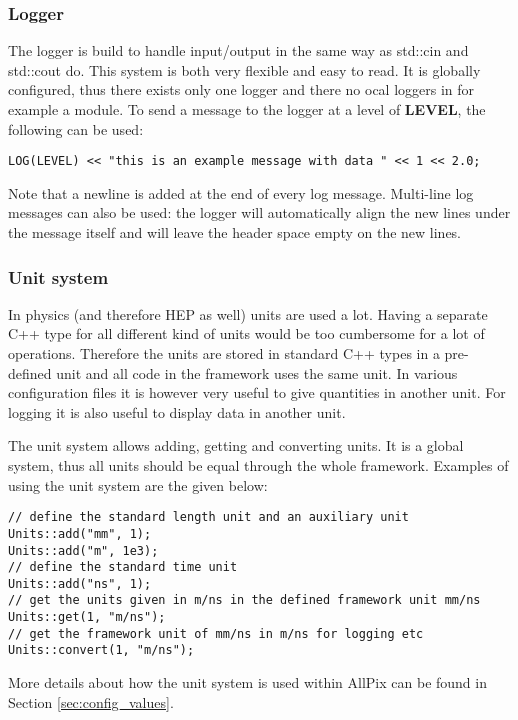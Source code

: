 \subsubsection{Logger}
\label{sec:logger}
The logger is build to handle input/output in the same way as std::cin and std::cout do. This system is both very flexible and easy to read. It is globally configured, thus there exists only one logger and there no ocal loggers in for example a module. To send a message to the logger at a level of \textbf{LEVEL}, the following can be used:
\begin{verbatim}
LOG(LEVEL) << "this is an example message with data " << 1 << 2.0;
\end{verbatim}
Note that a newline is added at the end of every log message. Multi-line log messages can also be used: the logger will automatically align the new lines under the message itself and will leave the header space empty on the new lines.


\subsubsection{Unit system}
\label{sec:unit_system}
In physics (and therefore HEP as well) units are used a lot. Having a separate C++ type for all different kind of units would be too cumbersome for a lot of operations. Therefore the units are stored in standard C++ types in a pre-defined unit and all code in the framework uses the same unit. In various configuration files it is however very useful to give quantities in another unit. For logging it is also useful to display data in another unit.

The unit system allows adding, getting and converting units. It is a global system, thus all units should be equal through the whole framework. Examples of using the unit system are the given below:
\begin{verbatim}
// define the standard length unit and an auxiliary unit
Units::add("mm", 1); 
Units::add("m", 1e3); 
// define the standard time unit
Units::add("ns", 1); 
// get the units given in m/ns in the defined framework unit mm/ns
Units::get(1, "m/ns"); 
// get the framework unit of mm/ns in m/ns for logging etc
Units::convert(1, "m/ns");
\end{verbatim}

More details about how the unit system is used within AllPix can be found in Section \ref{sec:config_values}.

